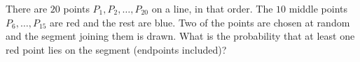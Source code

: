 There are $20$ points $P_1,P_2,\dots,P_{20}$ on a line, in that order. The $10$ middle points $P_6,\dots,P_{15}$ are red and the rest are blue. Two of the points are chosen at random and the segment joining them is drawn. What is the probability that at least one red point lies on the segment (endpoints included)?
